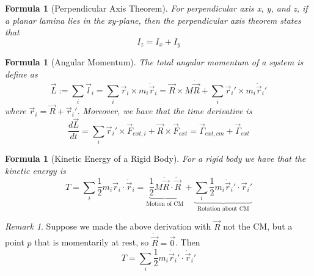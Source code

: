 \documentclass[12pt]{article}
\newtheorem{for}[thm]{Formula}
\theoremstyle{definition}
\theoremstyle{remark}
\newtheorem{rmk}[thm]{Remark}
\numberwithin{equation}{section}
\begin{document}
\vspace{15pt}

\begin{for}[Perpendicular Axis Theorem]
        For perpendicular axis x, y, and z, if a planar lamina lies in the xy-plane, then the perpendicular axis theorem states that \begin{equation}
                I_z = I_x + I_y
        \end{equation}
\end{for}


\vspace{15pt}

\begin{for}[Angular Momentum]
        The total angular momentum of a system is define as \begin{equation}
                \vec{L} := \sum_i\vec{l}_i = \sum_i\vec{r}_i\times m_i\dot{\vec{r}}_i = \vec{R}\times M\dot{\vec{R}} + \sum_i\vec{r}_i'\times m_i\dot{\vec{r}}_i'
        \end{equation}
        where $\vec{r}_i = \vec{R} + \vec{r}_i'$. Moreover, we have that the time derivative is \begin{equation}
                \frac{d\vec{L}}{dt} = \sum_i\vec{r}_i'\times \vec{F}_{ext,i} + \vec{R}\times \vec{F}_{ext} = \vec{\Gamma}_{ext,cm} + \vec{\Gamma}_{ext}
        \end{equation}
\end{for}

\vspace{15pt}


\begin{for}[Kinetic Energy of a Rigid Body]
        For a rigid body we have that the kinetic energy is \begin{equation}
                T = \sum_i\frac{1}{2}m_i\dot{\vec{r}}_i\cdot \dot{\vec{r}}_i = \underbrace{\frac{1}{2}M\dot{\vec{R}} \cdot \dot{\vec{R}}}_{\text{Motion of CM}} + \underbrace{\sum_i\frac{1}{2}m_i\dot{\vec{r}}_i'\cdot \dot{\vec{r}}_i'}_{\text{Rotation about CM}}
        \end{equation}
\end{for}

\vspace{15pt}


\begin{rmk}
        Suppose we made the above derivation with $\vec{R}$ not the CM, but a point $p$ that is momentarily at rest, so $\dot{\vec{R}} = \vec{0}$. Then \begin{equation}
                T = \sum_i\frac{1}{2}m_i\dot{\vec{r}}_i'\cdot \dot{\vec{r}}_i'
        \end{equation}
\end{rmk}
\end{document}
